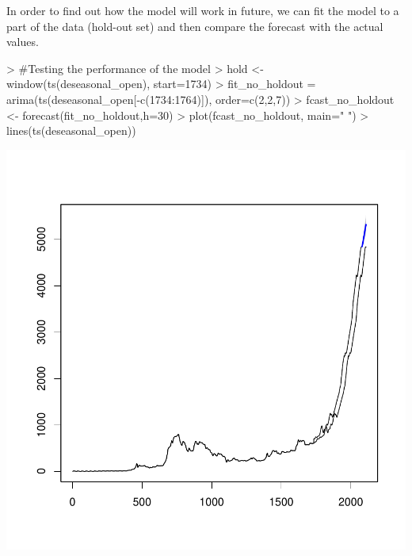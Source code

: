 \documentclass{article}
\begin{document}
In order to find out how the model will work in future, we can fit the model to a part of the data (hold-out set) and then compare the forecast with the actual values. 
\begin{Schunk}
\begin{Sinput}
> #Testing the performance of the model
> hold <- window(ts(deseasonal_open), start=1734)
> fit_no_holdout = arima(ts(deseasonal_open[-c(1734:1764)]), order=c(2,2,7))
> fcast_no_holdout <- forecast(fit_no_holdout,h=30)
> plot(fcast_no_holdout, main=" ")
> lines(ts(deseasonal_open))
\end{Sinput}
\end{Schunk}
\includegraphics{Report-024}
\end{document}
